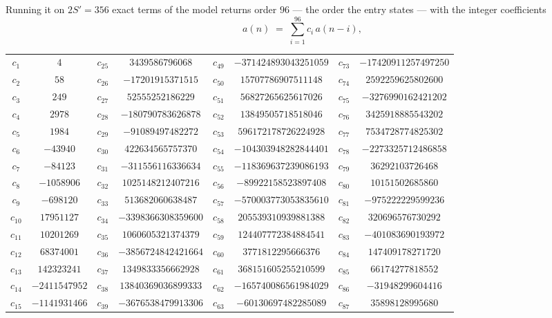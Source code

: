 \documentclass[11pt,a4paper]{article}
\theoremstyle{plain}
\theoremstyle{definition}
\begin{document}
Running it on $2S'=356$ exact terms of the model returns order $96$ --- the order the
entry states --- with the integer coefficients
\[
a(n)\;=\;\sum_{i=1}^{96}c_i\,a(n-i),
\]
\begin{center}\small
\begin{tabular}{cccccccc}
$c_{1}$ & $4$ & $c_{25}$ & $3439586796068$ & $c_{49}$ & $-371424893043251059$ & $c_{73}$ & $-17420911257497250$ \\
$c_{2}$ & $58$ & $c_{26}$ & $-17201915371515$ & $c_{50}$ & $15707786907511148$ & $c_{74}$ & $2592259625802600$ \\
$c_{3}$ & $249$ & $c_{27}$ & $52555252186229$ & $c_{51}$ & $56827265625617026$ & $c_{75}$ & $-3276990162421202$ \\
$c_{4}$ & $2978$ & $c_{28}$ & $-180790783626878$ & $c_{52}$ & $13849505718518046$ & $c_{76}$ & $3425918885543202$ \\
$c_{5}$ & $1984$ & $c_{29}$ & $-91089497482272$ & $c_{53}$ & $596172178726224928$ & $c_{77}$ & $7534728774825302$ \\
$c_{6}$ & $-43940$ & $c_{30}$ & $422634565757370$ & $c_{54}$ & $-104303948282844401$ & $c_{78}$ & $-2273325712486858$ \\
$c_{7}$ & $-84123$ & $c_{31}$ & $-311556116336634$ & $c_{55}$ & $-118369637239086193$ & $c_{79}$ & $36292103726468$ \\
$c_{8}$ & $-1058906$ & $c_{32}$ & $1025148212407216$ & $c_{56}$ & $-89922158523897408$ & $c_{80}$ & $10151502685860$ \\
$c_{9}$ & $-698120$ & $c_{33}$ & $513682060638487$ & $c_{57}$ & $-570003773053835610$ & $c_{81}$ & $-975222229599236$ \\
$c_{10}$ & $17951127$ & $c_{34}$ & $-3398366308359600$ & $c_{58}$ & $205539310939881388$ & $c_{82}$ & $320696576730292$ \\
$c_{11}$ & $10201269$ & $c_{35}$ & $1060605321374379$ & $c_{59}$ & $124407772384884541$ & $c_{83}$ & $-401083690193972$ \\
$c_{12}$ & $68374001$ & $c_{36}$ & $-3856724842421664$ & $c_{60}$ & $3771812295666376$ & $c_{84}$ & $147409178271720$ \\
$c_{13}$ & $142323241$ & $c_{37}$ & $1349833356662928$ & $c_{61}$ & $368151605255210599$ & $c_{85}$ & $66174277818552$ \\
$c_{14}$ & $-2411547952$ & $c_{38}$ & $13840369036899333$ & $c_{62}$ & $-165740086561984029$ & $c_{86}$ & $-31948299604416$ \\
$c_{15}$ & $-1141931466$ & $c_{39}$ & $-3676538479913306$ & $c_{63}$ & $-60130697482285089$ & $c_{87}$ & $35898128995680$ \\

\end{tabular}
\end{center}
\end{document}
